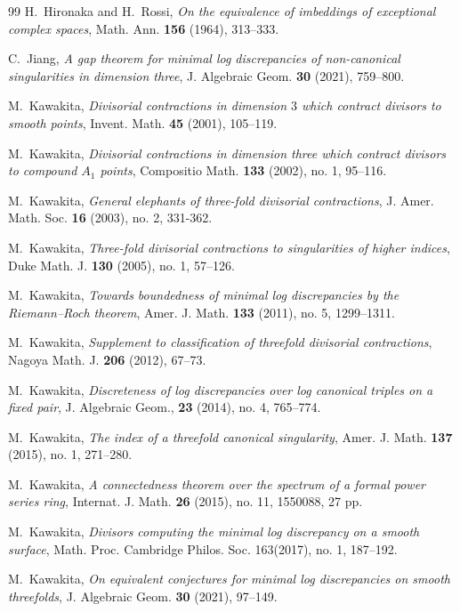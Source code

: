 \documentclass[11pt]{amsart}
\numberwithin{equation}{section}
\theoremstyle{definition}
\theoremstyle{definition}
\begin{document}
\begin{thebibliography}{99}
 H.~Hironaka and H.~Rossi, \textit{On the equivalence of imbeddings of exceptional complex spaces}, Math. Ann. \textbf{156} (1964), 313--333.

 C.~Jiang, \textit{A gap theorem for minimal log discrepancies of non-canonical singularities in dimension three}, J. Algebraic Geom. \textbf{30} (2021), 759--800.


 M.~Kawakita, \textit{Divisorial contractions in dimension $3$ which contract divisors to smooth points}, Invent. Math. \textbf{45} (2001), 105--119.
		
 M.~Kawakita, \textit{Divisorial contractions in dimension three which contract divisors to compound $A_1$ points}, Compositio Math. \textbf{133} (2002), no. 1, 95--116.

 M.~Kawakita, \textit{General elephants of three-fold divisorial contractions}, J. Amer. Math. Soc. \textbf{16} (2003), no. 2, 331-362.
		
 M.~Kawakita, \textit{Three-fold divisorial contractions to singularities of higher indices}, Duke Math. J. \textbf{130} (2005), no. 1, 57--126.

 M.~Kawakita, \textit{Towards boundedness of minimal log discrepancies by the Riemann--Roch theorem}, Amer. J. Math. \textbf{133} (2011), no. 5, 1299--1311.

 M.~Kawakita, \textit{Supplement to classification of threefold divisorial contractions}, Nagoya Math. J. \textbf{206} (2012), 67--73.
		
 M.~Kawakita, \textit{Discreteness of log discrepancies over log canonical triples on a fixed pair}, J. Algebraic Geom., \textbf{23} (2014), no. 4, 765--774.


 M.~Kawakita, \textit{The index of a threefold canonical singularity}, Amer. J. Math. \textbf{137} (2015), no. 1, 271--280.

 M.~Kawakita, \textit{A connectedness theorem over the spectrum of a formal power series ring}, Internat. J. Math. \textbf{26} (2015), no. 11, 1550088, 27 pp.

 M.~Kawakita, \textit{Divisors computing the minimal log discrepancy on a smooth	surface}, Math. Proc. Cambridge Philos. Soc. 163(2017), no. 1, 187--192.

 M.~Kawakita, \textit{On equivalent conjectures for minimal log discrepancies on smooth threefolds}, J. Algebraic Geom. \textbf{30} (2021), 97--149.
		

\end{thebibliography}
\end{document}

